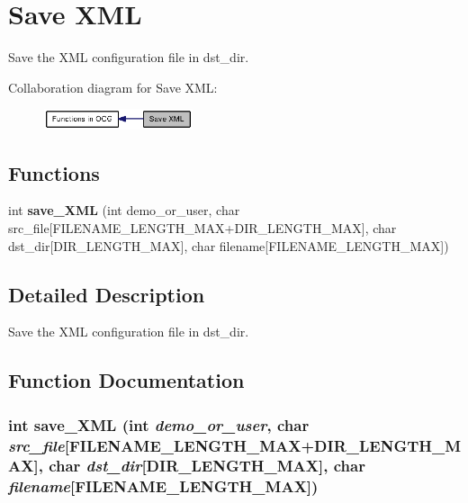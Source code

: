 \section{Save XML}
\label{group____save__XML}
Save the XML configuration file in dst\_\-dir.  




Collaboration diagram for Save XML:\nopagebreak
\begin{figure}[H]
\begin{center}
\leavevmode
\includegraphics[width=124pt]{group____save__XML}
\end{center}
\end{figure}
\subsection*{Functions}
\begin{CompactItemize}
\item 
int {\bf save\_\-XML} (int demo\_\-or\_\-user, char src\_\-file[FILENAME\_\-LENGTH\_\-MAX+DIR\_\-LENGTH\_\-MAX], char dst\_\-dir[DIR\_\-LENGTH\_\-MAX], char filename[FILENAME\_\-LENGTH\_\-MAX])
\end{CompactItemize}


\subsection{Detailed Description}
Save the XML configuration file in dst\_\-dir. 

\subsection{Function Documentation}
\subsubsection[{save\_\-XML}]{\setlength{\rightskip}{0pt plus 5cm}int save\_\-XML (int {\em demo\_\-or\_\-user}, \/  char {\em src\_\-file}[FILENAME\_\-LENGTH\_\-MAX+DIR\_\-LENGTH\_\-MAX], \/  char {\em dst\_\-dir}[DIR\_\-LENGTH\_\-MAX], \/  char {\em filename}[FILENAME\_\-LENGTH\_\-MAX])}\label{group____save__XML_gd4a5592435058c09f710a025ddba771e}


